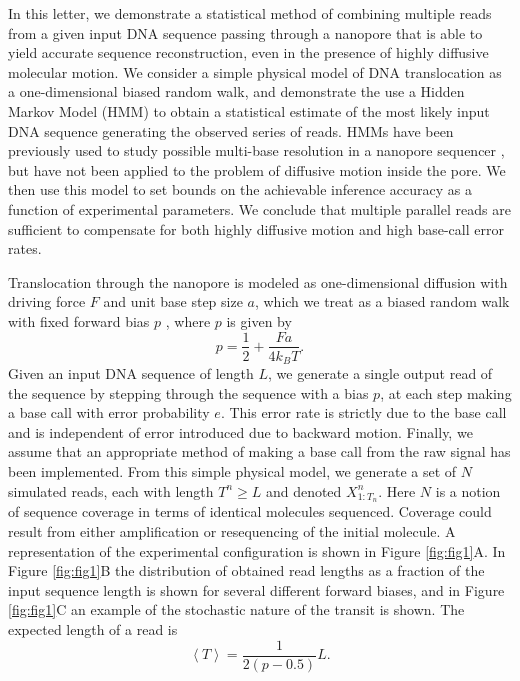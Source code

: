 \documentclass{biophys_letter}
\begin{document}
\begin{multicols}{2}
In this letter, we demonstrate a statistical method of combining multiple reads from a given input DNA sequence passing through a nanopore that is able to yield accurate sequence reconstruction, even in the presence of highly diffusive molecular motion.
We consider a simple physical model of DNA translocation as a one-dimensional biased random walk, and demonstrate the use a Hidden Markov Model (HMM) to obtain a statistical estimate of the most likely input DNA sequence generating the observed series of reads.
HMMs have been previously used to study possible multi-base resolution in a nanopore sequencer \cite{Timp:2012}, but have not been applied to the problem of diffusive motion inside the pore.
We then use this model to set bounds on the achievable inference accuracy as a function of experimental parameters.
We conclude that multiple parallel reads are sufficient to compensate for both highly diffusive motion and high base-call error rates.

Translocation through the nanopore is modeled as one-dimensional diffusion with driving force $F$ and unit base step size $a$, which we treat as a biased random walk with fixed forward bias $p$ \cite{Berg:1993}, where $p$ is given by
\begin{equation}
p = \frac{1}{2} + \frac{Fa}{4k_{B}T}.
\end{equation}
Given an input DNA sequence of length $L$, we generate a single output read of the sequence by stepping through the sequence with a bias $p$, at each step making a base call with error probability $e$.
This error rate is strictly due to the base call and is independent of error introduced due to backward motion. 
Finally, we assume that an appropriate method of making a base call from the raw signal has been implemented.
From this simple physical model, we generate a set of $N$ simulated reads, each with length $T^{n} \ge L$ and denoted $X^n_{1:T_n}$.
Here $N$ is a notion of sequence coverage in terms of identical molecules sequenced.
Coverage could result from either amplification or resequencing of the initial molecule.
A representation of the experimental configuration is shown in Figure \ref{fig:fig1}A.
In Figure \ref{fig:fig1}B the distribution of obtained read lengths as a fraction of the input sequence length is shown for several different forward biases, and in Figure \ref{fig:fig1}C an example of the stochastic nature of the transit is shown.
The expected length of a read is 
\begin{equation}
  \left\langle T  \right\rangle = \frac{1}{2(p-0.5)} L.
\end{equation}

\end{multicols}
\end{document}
